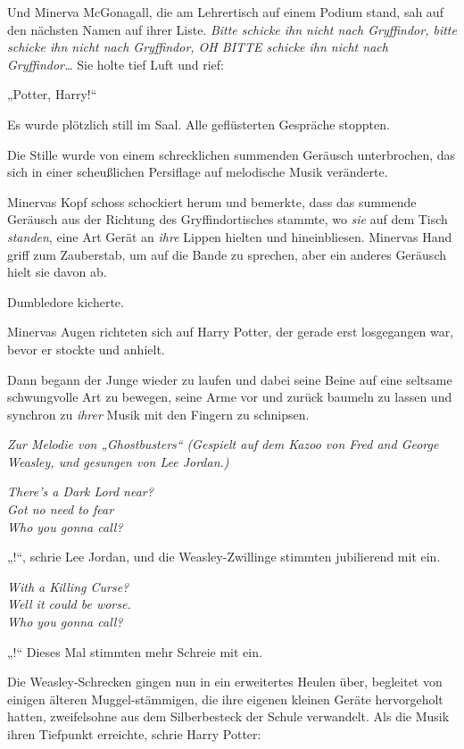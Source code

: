 Und Minerva McGonagall, die am Lehrertisch auf einem Podium stand, sah auf den nächsten Namen auf ihrer Liste. \emph{Bitte schicke ihn nicht nach Gryffindor, bitte schicke ihn nicht nach Gryffindor, OH BITTE schicke ihn nicht nach Gryffindor…} Sie holte tief Luft und rief:

„Potter, Harry!“

Es wurde plötzlich still im Saal. Alle geflüsterten Gespräche stoppten.

Die Stille wurde von einem schrecklichen summenden Geräusch unterbrochen, das sich in einer scheußlichen Persiflage auf melodische Musik veränderte.

Minervas Kopf schoss schockiert herum und bemerkte, dass das summende Geräusch aus der Richtung des Gryffindortisches stammte, wo \emph{sie} auf dem Tisch \emph{standen}, eine Art Gerät an \emph{ihre} Lippen hielten und hineinbliesen. Minervas Hand griff zum Zauberstab, um  auf die Bande zu sprechen, aber ein anderes Geräusch hielt sie davon ab.

Dumbledore kicherte.

Minervas Augen richteten sich auf Harry Potter, der gerade erst losgegangen war, bevor er stockte und anhielt.

Dann begann der Junge wieder zu laufen und dabei seine Beine auf eine seltsame schwungvolle Art zu bewegen, seine Arme vor und zurück baumeln zu lassen und synchron zu \emph{ihrer} Musik mit den Fingern zu schnipsen.

\begin{center}
\emph{Zur Melodie von „Ghostbusters“}
\emph{(Gespielt auf dem Kazoo von Fred and George Weasley, und gesungen von Lee Jordan.)}

\emph{There’s a Dark Lord near?\\
Got no need to fear\\
Who you gonna call?}
\end{center}

„!“, schrie Lee Jordan, und die Weasley-Zwillinge stimmten jubilierend mit ein.

\begin{center}
\emph{With a Killing Curse?\\
Well it could be worse.\\
Who you gonna call?}
\end{center}

„!“ Dieses Mal stimmten mehr Schreie mit ein.

Die Weasley-Schrecken gingen nun in ein erweitertes Heulen über, begleitet von einigen älteren Muggel-stämmigen, die ihre eigenen kleinen Geräte hervorgeholt hatten, zweifelsohne aus dem Silberbesteck der Schule verwandelt. Als die Musik ihren Tiefpunkt erreichte, schrie Harry Potter:

